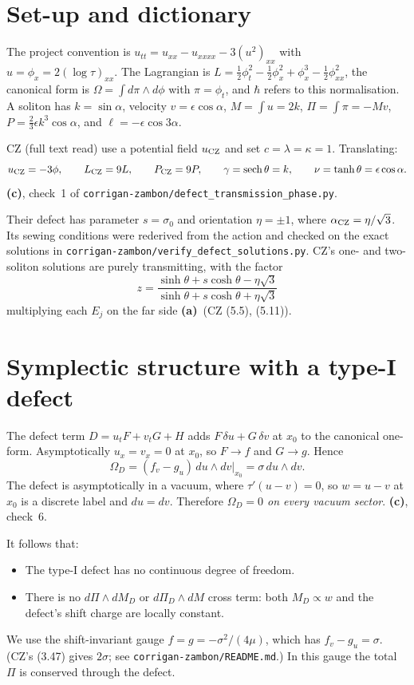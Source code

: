 \documentclass[11pt,a4paper]{article}
\newcommand{\La}{\textsf{\textbf{(a)}}}\newcommand{\Lb}{\textsf{\textbf{(b)}}}
\newcommand{\Lc}{\textsf{\textbf{(c)}}}\newcommand{\Ld}{\textsf{\textbf{(d)}}}
\newcommand{\script}[1]{\texttt{corrigan-zambon/#1}}
\begin{document}
\section{Set-up and dictionary}

The project convention is $u_{tt}=u_{xx}-u_{xxxx}-3(u^2)_{xx}$ with $u=\phi_x=2(\log\tau)_{xx}$. The Lagrangian is $L=\tfrac12\phi_t^2-\tfrac12\phi_x^2+\phi_x^3-\tfrac12\phi_{xx}^2$, the canonical form is $\Omega=\int d\pi\wedge d\phi$ with $\pi=\phi_t$, and $\hbar$ refers to this normalisation. A soliton has $k=\sin\alpha$, velocity $v=\epsilon\cos\alpha$, $M=\int u=2k$, $\Pi=\int\pi=-Mv$, $P=\tfrac23\epsilon k^3\cos\alpha$, and $\ell=-\epsilon\cos3\alpha$.

CZ \cite{CZ} (full text read) use a potential field $u_{\rm CZ}$ and set $c=\lambda=\kappa=1$. Translating:
\[
u_{\rm CZ}=-3\phi,\qquad L_{\rm CZ}=9L,\qquad P_{\rm CZ}=9P,\qquad \gamma=\operatorname{sech}\theta=k,\qquad \nu=\tanh\theta=\epsilon\cos\alpha .
\]
\Lc, check~1 of \script{defect\_transmission\_phase.py}.

Their defect has parameter $s=\sigma_0$ and orientation $\eta=\pm1$, where $\alpha_{\rm CZ}=\eta/\sqrt3$. Its sewing conditions were rederived from the action and checked on the exact solutions in \texttt{corrigan-zambon/verify\_defect\_solutions.py}. CZ's one- and two-soliton solutions are purely transmitting, with the factor
\[
z=\frac{\sinh\theta+s\cosh\theta-\eta\sqrt3}{\sinh\theta+s\cosh\theta+\eta\sqrt3}
\]
multiplying each $E_j$ on the far side \La\ (CZ (5.5), (5.11)).

\section{Symplectic structure with a type-I defect}

The defect term $D=u_tF+v_tG+H$ adds $F\,\delta u+G\,\delta v$ at $x_0$ to the canonical one-form. Asymptotically $u_x=v_x=0$ at $x_0$, so $F\to f$ and $G\to g$. Hence
\[
\Omega_D=(f_v-g_u)\,du\wedge dv\big|_{x_0}=\sigma\,du\wedge dv .
\]
The defect is asymptotically in a vacuum, where $\tau'(u-v)=0$, so $w=u-v$ at $x_0$ is a discrete label and $du=dv$. Therefore \emph{$\Omega_D=0$ on every vacuum sector}. \Lc, check~6.

It follows that:
\begin{itemize}
\item The type-I defect has no continuous degree of freedom.
\item There is no $d\Pi\wedge dM_D$ or $d\Pi_D\wedge dM$ cross term: both $M_D\propto w$ and the defect's shift charge are locally constant.
\end{itemize}
We use the shift-invariant gauge $f=g=-\sigma^2/(4\mu)$, which has $f_v-g_u=\sigma$. (CZ's (3.47) gives $2\sigma$; see \texttt{corrigan-zambon/README.md}.) In this gauge the total $\Pi$ is conserved through the defect.
\end{document}
